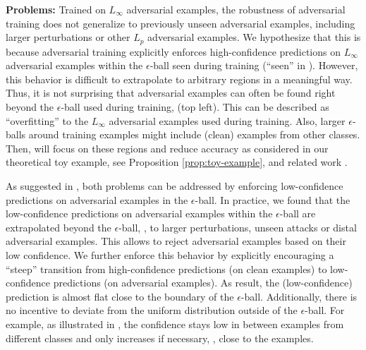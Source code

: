 \textbf{Problems:}
%
Trained on $L_\infty$ adversarial examples, the robustness of adversarial training does not generalize to previously unseen adversarial examples, including larger perturbations or other $L_p$ adversarial examples. We hypothesize that this is because adversarial training explicitly enforces high-confidence predictions on $L_\infty$ adversarial examples within the $\epsilon$-ball seen during training (``seen'' in ). However, this behavior is difficult to extrapolate to arbitrary regions in a meaningful way. Thus, it is not surprising that adversarial examples can often be found right beyond the $\epsilon$-ball used during training, \cf {} (top left). This can be described as ``overfitting'' to the $L_\infty$ adversarial examples used during training. Also, larger $\epsilon$-balls around training examples might include (clean) examples from other classes. Then,  will focus on these regions and reduce accuracy as considered in our theoretical toy example, see Proposition \ref{prop:toy-example}, and related work \citep{JacobsenICLR2019,JacobsenARXIV2019}.

As suggested in , both problems can be addressed by enforcing low-confidence predictions on adversarial examples in the $\epsilon$-ball. In practice, we found that the low-confidence predictions on adversarial examples within the $\epsilon$-ball are extrapolated beyond the $\epsilon$-ball, \ie, to larger perturbations, unseen attacks or distal adversarial examples. This allows to reject adversarial examples based on their low confidence. We further enforce this behavior by explicitly encouraging a ``steep'' transition from high-confidence predictions (on clean examples) to low-confidence predictions (on adversarial examples). As result, the (low-confidence) prediction is almost flat close to the boundary of the $\epsilon$-ball. Additionally, there is no incentive to deviate from the uniform distribution outside of the $\epsilon$-ball. For example, as illustrated in , the confidence stays low in between examples from different classes and only increases if necessary, \ie, close to the examples.

